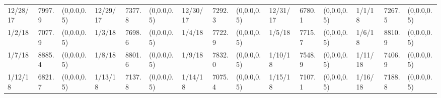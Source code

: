 \documentclass[12pt]{article}
\begin{document}
\begin{table}
\begin{center}
\begin{tabular}{p{15pt}p{15pt}p{25pt}p{15pt}p{15pt}p{25pt}p{15pt}p{15pt}p{25pt}p{15pt}p{15pt}p{25pt}p{15pt}p{15pt}p{25pt}}
    12/28/17&7997.9&(0,0.0,0.5)&12/29/17&7377.8&(0,0.0,0.5)&12/30/17&7292.3&(0,0.0,0.5)&12/31/17&6780.1&(0,0.0,0.5)&1/1/18&7267.5&(0,0.0,0.5)\\
    1/2/18&7077.9&(0,0.0,0.5)&1/3/18&7698.6&(0,0.0,0.5)&1/4/18&7722.9&(0,0.0,0.5)&1/5/18&7715.7&(0,0.0,0.5)&1/6/18&8810.9&(0,0.0,0.5)\\
    1/7/18&8885.4&(0,0.0,0.5)&1/8/18&8801.6&(0,0.0,0.5)&1/9/18&7832.0&(0,0.0,0.5)&1/10/18&7548.9&(0,0.0,0.5)&1/11/18&7406.9&(0,0.0,0.5)\\
    1/12/18&6821.7&(0,0.0,0.5)&1/13/18&7137.8&(0,0.0,0.5)&1/14/18&7075.4&(0,0.0,0.5)&1/15/18&7107.1&(0,0.0,0.5)&1/16/18&7188.8&(0,0.0,0.5)\\
    \bottomrule 
    \end{tabular}
    \end{center}
    \end{table}
\end{document}
